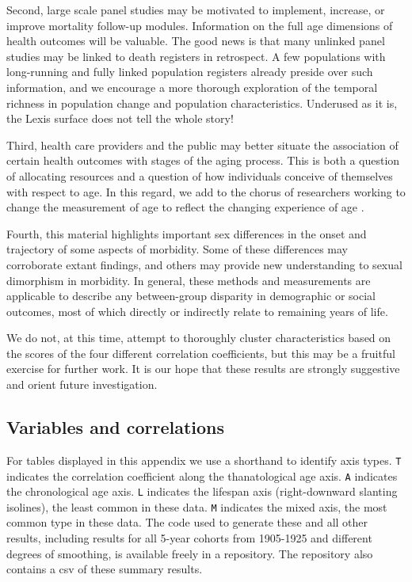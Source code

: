 \documentclass[11pt,oneside]{article} %
\begin{document}
Second, large scale panel studies may be motivated to
implement, increase, or improve mortality follow-up modules. Information
on the full age dimensions of health outcomes will be valuable. The good news is
that many unlinked panel studies may be linked to death registers in
retrospect. A few populations with long-running and fully linked
population registers already preside over such information, and we encourage a
more thorough exploration of the temporal richness in population change and
population characteristics. Underused as it is, the Lexis surface does not tell
the whole story! 

Third, health care providers and the public may better situate the association
of certain health outcomes with stages of the aging process. This is both a
question of allocating resources and a question of how individuals conceive of
themselves with respect to age. In this regard, we add to the chorus of
researchers working to change the measurement of age to reflect the changing
experience of age \citep[see e.g.,][]{sanderson2013characteristics}. 

Fourth,
this material highlights important sex differences in the onset and trajectory
of some aspects of morbidity. Some of these differences may
corroborate extant findings, and others may provide new understanding to sexual dimorphism in
morbidity. In general, these methods and measurements are applicable to describe
any between-group disparity in demographic or social outcomes, most of which
directly or indirectly relate to remaining years of life.



We do not, at this time, attempt to thoroughly cluster
characteristics based on the scores of the four different correlation
coefficients, but this may be a fruitful exercise for further work. It is our hope that these results are strongly suggestive and orient
future investigation.

\singlespacing

   
%  

%
\begin{appendices}
\section{Variables and correlations}

\end{appendices}

For tables displayed in this appendix we use a shorthand to identify axis types.
\texttt{T} indicates the correlation coefficient along the thanatological age axis.
\texttt{A} indicates the chronological age axis. \texttt{L} indicates the lifespan axis
(right-downward slanting isolines), the least common in these data. \texttt{M}
indicates the mixed axis, the most common type in these data. The code used to generate these and all other
results, including results for all 5-year cohorts from 1905-1925 and different
degrees of smoothing, is available freely in a repository. The repository also
contains a csv of these summary results.
\end{document}
